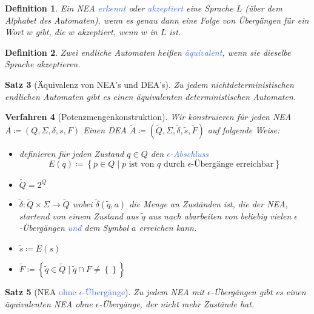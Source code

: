 \documentclass[11pt]{scrartcl}
\newcommand{\tcol}[1]{\textcolor{RoyalBlue}{#1}}
\newcommand{\set}[1]{\left\lbrace #1\right\rbrace}
\theoremstyle{break}
\newtheorem{satz}{Satz}[section]
\newtheorem{defi}[satz]{Definition}
\newtheorem{verf}[satz]{Verfahren}
\begin{document}
    \begin{defi}
        Ein NEA \tcol{erkennt} oder \tcol{akzeptiert} eine Sprache $L$ (über dem Alphabet des Automaten), wenn es genau dann eine Folge von Übergängen für ein Wort $w$ gibt, die $w$ akzeptiert, wenn $w$ in $L$ ist.
    \end{defi}

    \begin{defi}
        Zwei endliche Automaten heißen \tcol{äquivalent}, wenn sie dieselbe Sprache akzeptieren.
    \end{defi}

    \begin{satz}[Äquivalenz von NEA's und DEA's]
        Zu jedem nichtdeterministischen endlichen Automaten gibt es einen äquivalenten deterministischen Automaten.
    \end{satz}

    \begin{verf}[Potenzmengenkonstruktion]
        Wir konstruieren für jeden NEA $A\coloneqq (Q,\Sigma ,\delta ,s,F)$ Einen DEA $\tilde{A}\coloneqq (\tilde{Q},\Sigma ,\tilde{\delta},\tilde{s},\tilde{F})$ auf folgende Weise:
        \begin{itemize}
            \item definieren für jeden Zustand $q\in Q$ den \tcol{$\epsilon$-Abschluss} \[E(q)\coloneqq \set{p\in Q\mid p \text{ ist von } q \text{ durch } \epsilon\text{-Übergänge erreichbar}}\]
            \item $\tilde{Q} = 2^Q$
            \item $\tilde{\delta}\colon\tilde{Q}\times\Sigma\to\tilde{Q}$ wobei $\tilde{\delta}(\tilde{q},a)$ die Menge an Zuständen ist, die der NEA, startend von einem Zustand aus $\tilde{q}$ aus nach abarbeiten von beliebig vielen $\epsilon$-Übergängen \tcol{und} dem Symbol $a$ erreichen kann.
            \item $\tilde{s}\coloneqq E(s)$
            \item $\tilde{F}\coloneqq \set{\tilde{q}\in\tilde{Q}\mid\tilde{q}\cap F\neq\set{}}$
        \end{itemize}
    \end{verf}

    \begin{satz}[NEA \tcol{ohne $\epsilon$-Übergänge}]
        Zu jedem NEA mit $\epsilon$-Übergängen gibt es einen äquivalenten NEA ohne $\epsilon$-Übergänge, der nicht mehr Zustände hat.
    \end{satz}
\end{document}
